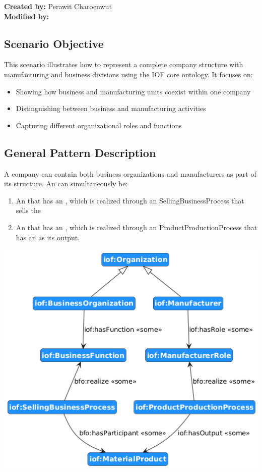 \label{chapter-scenario-template}
\textbf{Created by:} Perawit Charoenwut \\
\textbf{Modified by:}

\subsection*{Scenario Objective}
This scenario illustrates how to represent a complete company structure with manufacturing and business divisions using the IOF core ontology. It focuses on:
\begin{itemize}
    \item Showing how business and manufacturing units coexist within one company
    \item Distinguishing between business and manufacturing activities
    \item Capturing different organizational roles and functions
\end{itemize}

\subsection*{General Pattern Description}
A company can contain both business organizations and manufacturers as part of its structure.
An  can simultaneously be:
\begin{enumerate}
    \item An  that has an , which is realized through an  {SellingBusinessProcess} that sells the 
    \item An  that has an , which is realized through an  {ProductProductionProcess} that  has an  as its output.
\end{enumerate}

\includegraphics[scale=0.6]{scenarios/different-type-organizations/image/different-type-organizations-schema}

